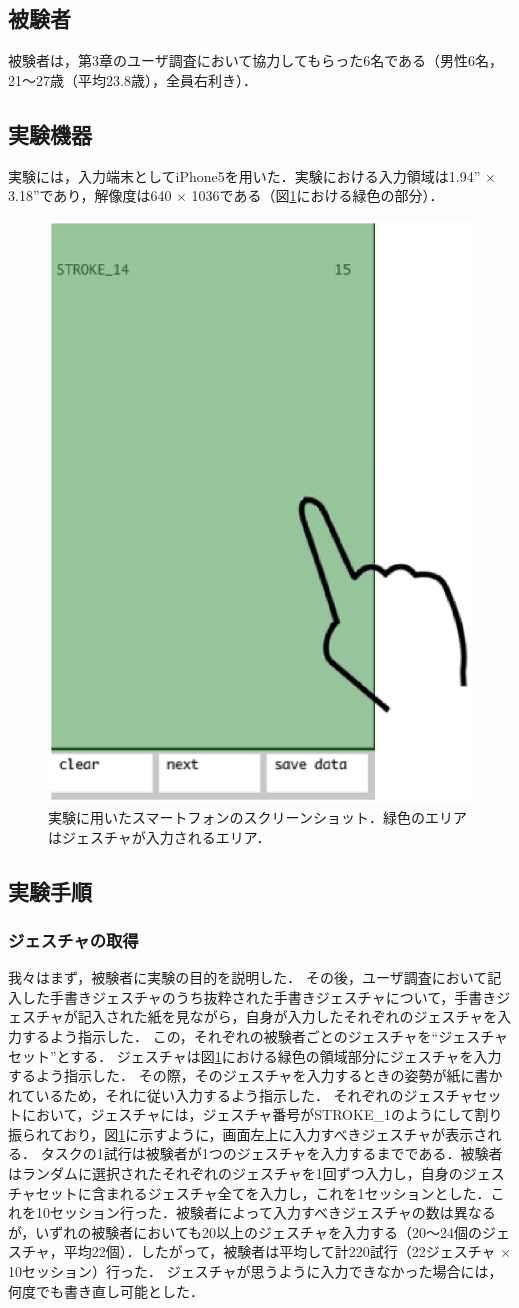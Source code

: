 \subsection{被験者}
被験者は，第3章のユーザ調査において協力してもらった6名である（男性6名，21〜27歳（平均23.8歳），全員右利き）．

\subsection{実験機器}
実験には，入力端末としてiPhone5を用いた．実験における入力領域は1.94'' × 3.18''であり，解像度は640 × 1036である（図\ref{fig:screenshot}における緑色の部分）．

\begin{figure}[!h]
\centering
\includegraphics[width=0.4\columnwidth]{img/screenshot.eps}
\caption{実験に用いたスマートフォンのスクリーンショット．緑色のエリアはジェスチャが入力されるエリア．}
\label{fig:screenshot}
\end{figure}


\subsection{実験手順}
\subsubsection{ジェスチャの取得}
我々はまず，被験者に実験の目的を説明した．
その後，ユーザ調査において記入した手書きジェスチャのうち抜粋された手書きジェスチャについて，手書きジェスチャが記入された紙を見ながら，自身が入力したそれぞれのジェスチャを入力するよう指示した．
この，それぞれの被験者ごとのジェスチャを``ジェスチャセット''とする．
ジェスチャは図\ref{fig:screenshot}における緑色の領域部分にジェスチャを入力するよう指示した．
その際，そのジェスチャを入力するときの姿勢が紙に書かれているため，それに従い入力するよう指示した．
それぞれのジェスチャセットにおいて，ジェスチャには，ジェスチャ番号がSTROKE\_1のようにして割り振られており，図\ref{fig:screenshot}に示すように，画面左上に入力すべきジェスチャが表示される．
タスクの1試行は被験者が1つのジェスチャを入力するまでである．被験者はランダムに選択されたそれぞれのジェスチャを1回ずつ入力し，自身のジェスチャセットに含まれるジェスチャ全てを入力し，これを1セッションとした．これを10セッション行った．被験者によって入力すべきジェスチャの数は異なるが，いずれの被験者においても20以上のジェスチャを入力する（20〜24個のジェスチャ，平均22個）．したがって，被験者は平均して計220試行（22ジェスチャ $\times$ 10セッション）行った．
ジェスチャが思うように入力できなかった場合には，何度でも書き直し可能とした．

